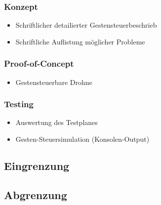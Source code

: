 \subsubsection{Konzept}
\begin{itemize}
	\item Schriftlicher detailierter Gestensteuerbeschrieb
	\item Schriftliche Auflistung möglicher Probleme
\end{itemize}

\subsubsection{Proof-of-Concept}
\begin{itemize}
	\item Gestensteuerbare Drohne
\end{itemize}

\subsubsection{Testing}
\begin{itemize}
	\item Auswertung des Testplanes
	\item Gesten-Steuersimulation (Konsolen-Output)
\end{itemize}


\subsection{Eingrenzung}

\subsection{Abgrenzung}

